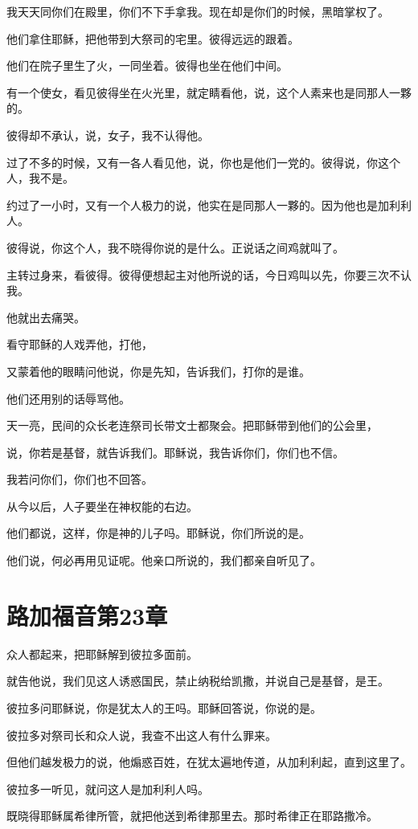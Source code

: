 \documentclass[12pt,oneside]{book}
\begin{document}
我天天同你们在殿里，你们不下手拿我。现在却是你们的时候，黑暗掌权了。

他们拿住耶稣，把他带到大祭司的宅里。彼得远远的跟着。

他们在院子里生了火，一同坐着。彼得也坐在他们中间。

有一个使女，看见彼得坐在火光里，就定睛看他，说，这个人素来也是同那人一夥的。

彼得却不承认，说，女子，我不认得他。

过了不多的时候，又有一各人看见他，说，你也是他们一党的。彼得说，你这个人，我不是。

约过了一小时，又有一个人极力的说，他实在是同那人一夥的。因为他也是加利利人。

彼得说，你这个人，我不晓得你说的是什么。正说话之间鸡就叫了。

主转过身来，看彼得。彼得便想起主对他所说的话，今日鸡叫以先，你要三次不认我。

他就出去痛哭。

看守耶稣的人戏弄他，打他，

又蒙着他的眼睛问他说，你是先知，告诉我们，打你的是谁。

他们还用别的话辱骂他。

天一亮，民间的众长老连祭司长带文士都聚会。把耶稣带到他们的公会里，

说，你若是基督，就告诉我们。耶稣说，我告诉你们，你们也不信。

我若问你们，你们也不回答。

从今以后，人子要坐在神权能的右边。

他们都说，这样，你是神的儿子吗。耶稣说，你们所说的是。

他们说，何必再用见证呢。他亲口所说的，我们都亲自听见了。

\chapter{路加福音第23章}
众人都起来，把耶稣解到彼拉多面前。

就告他说，我们见这人诱惑国民，禁止纳税给凯撒，并说自己是基督，是王。

彼拉多问耶稣说，你是犹太人的王吗。耶稣回答说，你说的是。

彼拉多对祭司长和众人说，我查不出这人有什么罪来。

但他们越发极力的说，他煽惑百姓，在犹太遍地传道，从加利利起，直到这里了。

彼拉多一听见，就问这人是加利利人吗。

既晓得耶稣属希律所管，就把他送到希律那里去。那时希律正在耶路撒冷。
\end{document}
